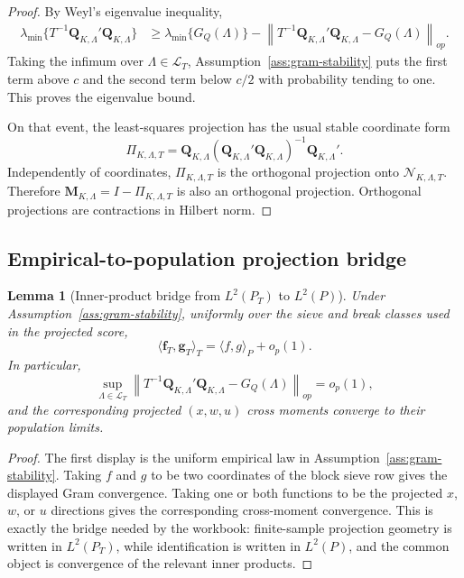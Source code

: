 \documentclass[12pt]{article}
\numberwithin{equation}{section}
\newtheorem{lemma}{Lemma}
\theoremstyle{definition}
\newcommand{\op}{o_p}
\newcommand{\N}{\mathcal N}
\newcommand{\innerT}[2]{\langle #1,#2\rangle_T}
\newcommand{\innerP}[2]{\langle #1,#2\rangle_P}
\begin{document}
\begin{proof}
By Weyl's eigenvalue inequality,
\[
\begin{aligned}
\lambda_{\min}\{T^{-1}\bm Q_{K,\Lambda}'\bm Q_{K,\Lambda}\}
&\ge
\lambda_{\min}\{G_Q(\Lambda)\}
-\left\|T^{-1}\bm Q_{K,\Lambda}'\bm Q_{K,\Lambda}-G_Q(\Lambda)\right\|_{op}.
\end{aligned}
\]
Taking the infimum over \(\Lambda\in\mathcal L_T\), Assumption~\ref{ass:gram-stability}
puts the first term above \(c\) and the second term below \(c/2\) with
probability tending to one. This proves the eigenvalue bound.

On that event, the least-squares projection has the usual stable coordinate
form
\[
    \Pi_{K,\Lambda,T}
    =\bm Q_{K,\Lambda}
      (\bm Q_{K,\Lambda}'\bm Q_{K,\Lambda})^{-1}
      \bm Q_{K,\Lambda}'.
\]
Independently of coordinates, \(\Pi_{K,\Lambda,T}\) is the orthogonal projection
onto \(\N_{K,\Lambda,T}\). Therefore
\(\bm M_{K,\Lambda}=I-\Pi_{K,\Lambda,T}\) is also an orthogonal projection.
Orthogonal projections are contractions in Hilbert norm.
\end{proof}

\subsection{Empirical-to-population projection bridge}

\begin{lemma}[Inner-product bridge from \(L^2(P_T)\) to \(L^2(P)\)]
\label{lem:part2-inner-product-bridge}
Under Assumption~\ref{ass:gram-stability}, uniformly over the sieve and break
classes used in the projected score,
\[
    \innerT{\bm f_T}{\bm g_T}=\innerP{f}{g}+\op(1).
\]
In particular,
\[
    \sup_{\Lambda\in\mathcal L_T}
    \left\|T^{-1}\bm Q_{K,\Lambda}'\bm Q_{K,\Lambda}-G_Q(\Lambda)\right\|_{op}
    =\op(1),
\]
and the corresponding projected \((x,w,u)\) cross moments converge to their
population limits.
\end{lemma}

\begin{proof}
The first display is the uniform empirical law in
Assumption~\ref{ass:gram-stability}. Taking \(f\) and \(g\) to be two
coordinates of the block sieve row gives the displayed Gram convergence.
Taking one or both functions to be the projected \(x\), \(w\), or \(u\)
directions gives the corresponding cross-moment convergence. This is exactly
the bridge needed by the workbook: finite-sample projection geometry is written
in \(L^2(P_T)\), while identification is written in \(L^2(P)\), and the common
object is convergence of the relevant inner products.
\end{proof}
\end{document}
